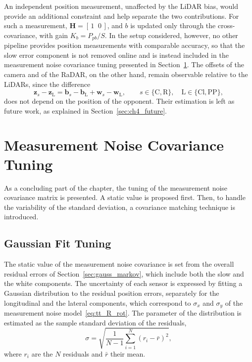 An independent position measurement, unaffected by the LiDAR bias, would provide an
additional constraint and help separate the two contributions. For such a measurement,
$\mathbf{H} = [\,1 \;\; 0\,]$, and $b$ is updated only through the cross-covariance, with
gain $K_b = P_{pb}/S$. In the setup considered, however, no other pipeline provides position
measurements with comparable accuracy, so that the slow error component is not removed
online and is instead included in the measurement noise covariance tuning presented in
Section~\ref{sec:meas_cov}. The offsets of the camera and of the RaDAR, on the other hand,
remain observable relative to the LiDARs, since the difference
\begin{equation}
    \mathbf{z}_s - \mathbf{z}_{\mathrm{L}} =
    \mathbf{b}_s - \mathbf{b}_{\mathrm{L}} + \mathbf{w}_s - \mathbf{w}_{\mathrm{L}},
    \qquad s \in \{\mathrm{C}, \mathrm{R}\}, \quad \mathrm{L} \in \{\mathrm{Cl}, \mathrm{PP}\},
    \label{eq:gm_relative}
\end{equation}
does not depend on the position of the opponent. Their estimation is left as future work, as
explained in Section~\ref{sec:ch4_future}.

\section{Measurement Noise Covariance Tuning}
\label{sec:meas_cov}

As a concluding part of the chapter, the tuning of the measurement noise covariance matrix
is presented. A static value is proposed first. Then, to handle the variability of the
standard deviation, a covariance matching technique is introduced.

\subsection{Gaussian Fit Tuning}
\label{sec:gaussian_fit}

The static value of the measurement noise covariance is set from the overall residual
errors of Section~\ref{sec:gauss_markov}, which include both the slow and the white
components. The uncertainty of each sensor is expressed by fitting a Gaussian distribution
to the residual position errors, separately for the longitudinal and the lateral
components, which correspond to $\sigma_x$ and $\sigma_y$ of the measurement noise
model~\eqref{eq:tt_R_rot}. The parameter of the distribution is estimated as the sample
standard deviation of the residuals,
\begin{equation}
    \sigma = \sqrt{\frac{1}{N-1}\sum_{i=1}^{N}\left(r_i - \bar{r}\right)^2},
    \label{eq:sigma_std}
\end{equation}
where $r_i$ are the $N$ residuals and $\bar{r}$ their mean.

